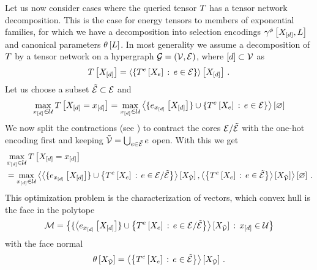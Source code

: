 Let us now consider cases where the queried tensor $T$ has a tensor network decomposition.
This is the case for energy tensors to members of exponential families, for which we have a decomposition into selection encodings $\gamma^{\phi}\left[X_{[d]},L\right]$ and canonical parameters $\theta\left[L\right]$.
In most generality we assume a decomposition of $T$ by a tensor network on a hypergraph $\mathcal{G}=(\mathcal{V},\mathcal{E})$, where $[d]\subset\mathcal{V}$ as
\begin{align*}
    T\left[X_{[d]}\right] = \left\langle \left\{T^{e}\left[X_{e}\right]\, : \, e\in\mathcal{E}\right\}\right\rangle \left[ X_{[d]} \right] \, .
\end{align*}
Let us choose a subset $\tilde{\mathcal{E}}\subset\mathcal{E}$ and
\begin{align*}
    \max_{x_{[d]}\in\mathcal{U}} T\left[X_{[d]}=x_{[d]}\right]
    = \max_{x_{[d]}\in\mathcal{U}} \left\langle \{e_{x_{[d]}}\left[X_{[d]}\right]\} \cup \left\{T^{e}\left[X_{e}\right]\, : \, e\in\mathcal{E}\right\}\right\rangle \left[ \varnothing \right]
\end{align*}
We now split the contractions (see ) to contract the cores $\mathcal{E}/\tilde{\mathcal{E}}$ with the one-hot encoding first and keeping $\tilde{\mathcal{V}}=\bigcup_{e\in\tilde{\mathcal{E}}}e$ open.
With this we get
\begin{align*}
    & \max_{x_{[d]}\in\mathcal{U}} T\left[X_{[d]}=x_{[d]}\right] \\
    & = \max_{x_{[d]}\in\mathcal{U}}
    \left\langle 
        \left\langle \{e_{x_{[d]}}\left[X_{[d]}\right]\} \cup \left\{T^{e}\left[X_{e}\right]\, : \, e\in\mathcal{E}/\tilde{\mathcal{E}}\right\}\right\rangle \left[ X_{\tilde{\mathcal{V}}} \right],
        \left\langle \left\{T^{e}\left[X_{e}\right]\, : \, e\in\tilde{\mathcal{E}}\right\}\right\rangle \left[ X_{\tilde{\mathcal{V}}} \right]
    \right\rangle \left[ \varnothing \right] \, .
\end{align*}
This optimization problem is the characterization of vectors, which convex hull is the face in the polytope
\begin{align*}
    \mathcal{M} = \left\{\{\left\langle e_{x_{[d]}}\left[X_{[d]}\right]\} \cup \left\{T^{e}\left[X_{e}\right]\, : \, e\in\mathcal{E}/\tilde{\mathcal{E}}\right\}\right\rangle \left[ X_{\tilde{\mathcal{V}}} \right] \, : \, x_{[d]}\in\mathcal{U} \right\}
\end{align*}
with the face normal
\begin{align*}
    \theta\left[X_{\tilde{\mathcal{V}}}\right] =
    \left\langle \left\{T^{e}\left[X_{e}\right]\, : \, e\in\tilde{\mathcal{E}}\right\}\right\rangle \left[ X_{\tilde{\mathcal{V}}} \right] \, .
\end{align*}


